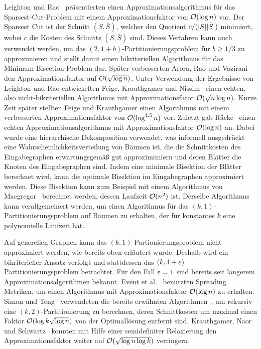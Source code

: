 Leighton und Rao~\cite{LR99} präsentierten einen Approximationsalgorithmus für das Sparsest-Cut-Problem mit einem Approximationsfaktor von $\mathcal{O}(\log n)$ vor.
Der Sparsest Cut ist der Schnitt $(S, \bar{S})$, welcher den Quotient $c/(\lvert S\rvert \lvert\bar{S}\rvert)$ minimiert, wobei $c$ die Kosten des Schnitts $(S, \bar{S})$ sind.
Dieses Verfahren kann auch verwendet werden, um das $(2, 1 + b)$\hyp Partitionierungsproblem für $b \geq 1/3$ zu approximieren und stellt damit einen bikriteriellen Algorithmus für das Minimum-Bisection-Problem dar.
Später verbesserten Arora, Rao und Vazirani~\cite{ARV09} den Approximationsfaktor auf $\mathcal{O}(\sqrt{\log n})$.
Unter Verwendung der Ergebnisse von Leighton und Rao entwickelten Feige, Krauthgamer und Nissim~\cite{FKN00} einen echten, also nicht-bikriteriellen Algorithmus mit Approximationsfator $\mathcal{O}(\sqrt{n} \log n)$.
Kurze Zeit später stellten Feige und Krauthgamer einen Algorithmus mit einem verbesserten Approximationsfaktor von $\mathcal{O}(\log^{1.5} n)$ vor.
Zuletzt gab Räcke~\cite{rc08} einen echten Approximationsalgorithmus mit Approximationsfaktor $\mathcal{O}(\log n)$ an.
Dabei wurde eine hierarchische Dekomposition verwendet, was informell ausgedrückt eine Wahrscheinlichkeitsverteilung von Bäumen ist, die die Schnittkosten des Eingabegraphen erwartungsgemäß gut approximimiern und deren Blätter die Knoten des Eingabegraphen sind.
Indem eine minimale Bisektion der Blätter berechnet wird, kann die optimale Bisektion im Eingabegraphen approximiert werden.
Diese Bisektion kann zum Beispiel mit einem Algorithmus von Macgregor~\cite{mcg78} berechnet werden, dessen Laufzeit $\mathcal{O}(n^2)$ ist.
Derselbe Algorithmus kann verallgemeinert werden, um einen Algorithmus für das $(k, 1)$\hyp Partitionierungsproblem auf Bäumen zu erhalten, der für konstantes $k$ eine polynomielle Laufzeit hat.

Auf generellen Graphen kann das $(k, 1)$\hyp Partionierungsproblem nicht approximiert werden, wie bereits oben erläutert wurde.
Deshalb wird ein bikriterieller Ansatz verfolgt und stattdessen das $(k,1+\varepsilon)$\hyp Partitionierungsproblem betrachtet.
Für den Fall $\varepsilon = 1$ sind bereits seit längerem Approximationsalgorithmen bekannt.
Event et al.~\cite{ENR+97} benutzten Spreading Metriken, um einen Algorithmus mit Approximationsfaktor $\mathcal{O}(\log n)$ zu erhalten.
Simon und Teng~\cite{ST97} verwendeten die bereits erwähnten Algorithmen~\cite{LR99, ARV09}, um rekursiv eine $(k, 2)$\hyp Partitionierung zu berechnen, deren Schnittkosten um maximal einen Faktor $\mathcal{O}(\log k \sqrt{\log n})$ von der Optimallösung entfernt sind.
Krauthgamer, Naor und Schwartz~\cite{KNS09} konnten mit Hilfe einer semidefiniter Relaxierung den Approximationsfaktor weiter auf $\mathcal{O}(\sqrt{\log n \log k})$ verringern.

